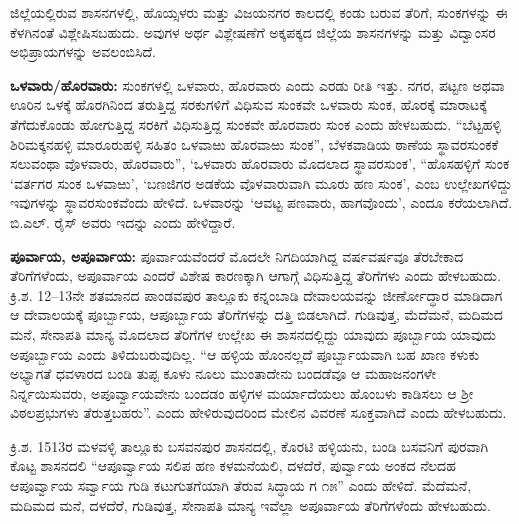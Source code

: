 ಜಿಲ್ಲೆಯಲ್ಲಿರುವ ಶಾಸನಗಳಲ್ಲಿ, ಹೊಯ್ಸಳರು ಮತ್ತು ವಿಜಯನಗರ ಕಾಲದಲ್ಲಿ ಕಂಡು ಬರುವ ತೆರಿಗೆ, ಸುಂಕಗಳನ್ನು ಈ ಕೆಳಗಿನಂತೆ ವಿಶ್ಲೇಷಿಸಬಹುದು. ಅವುಗಳ ಅರ್ಥ ವಿಶ್ಲೇಷಣೆಗೆ ಅಕ್ಕಪಕ್ಕದ ಜಿಲ್ಲೆಯ ಶಾಸನಗಳನ್ನು ಮತ್ತು ವಿದ್ವಾಂಸರ ಅಭಿಪ್ರಾಯಗಳನ್ನು ಅವಲಂಬಿಸಿದೆ.

\newpage

\textbf{ಒಳವಾರು/ಹೊರವಾರು: } ಸುಂಕಗಳಲ್ಲಿ ಒಳವಾರು, ಹೊರವಾರು ಎಂದು ಎರಡು ರೀತಿ ಇತ್ತು. ನಗರ, ಪಟ್ಟಣ ಅಥವಾ ಊರಿನ ಒಳಕ್ಕೆ ಹೊರಗಿನಿಂದ ತರುತ್ತಿದ್ದ ಸರಕುಗಳಿಗೆ ವಿಧಿಸುವ ಸುಂಕವೇ ಒಳವಾರು ಸುಂಕ, ಹೊರಕ್ಕೆ ಮಾರಾಟಕ್ಕೆ ತೆಗೆದುಕೊಂಡು ಹೋಗುತ್ತಿದ್ದ ಸರಕಿಗೆ ವಿಧಿಸುತ್ತಿದ್ದ ಸುಂಕವೇ ಹೊರವಾರು ಸುಂಕ ಎಂದು ಹೇಳಬಹುದು. “ಬೆಟ್ಟಹಳ್ಳಿ ಶಿರಿಮಕ್ಕನಹಳ್ಳಿ ಮಾರೂರುಹಳ್ಳಿ ಸಹಿತಂ ಒಳವಾಱು ಹೊರವಾಱು ಸುಂಕ”, ಬೆಳಕವಾಡಿಯ ಠಾಣೆಯ ಸ್ಥಾವರಸುಂಕಕೆ ಸಲುವಂಥಾ ವೊಳವಾರು, ಹೊರವಾರು”, ‘ಒಳವಾರು ಹೊರವಾರು ಮೊದಲಾದ ಸ್ಥಾವರಸುಂಕ’, “ಹೊಸಹಳ್ಳಿಗೆ ಸುಂಕ ‘ವರ್ತಗರ ಸುಂಕ ಒಳವಾಱು’, ‘ಬಣಜಿಗರ ಅಡಕೆಯ ವೊಳವಾರುವಾಗಿ ಮೂರು ಹಣ ಸುಂಕ’, ಎಂಬ ಉಲ್ಲೇಖಗಳಿದ್ದು ಇವುಗಳನ್ನು ಸ್ಥಾವರಸುಂಕವೆಂದು ಹೇಳಿದೆ. ಒಳವಾರನ್ನು ‘ಆವಟ್ಟ ಪಣವಾರು, ಹಾಗವೊಂದು’, ಎಂದೂ ಕರೆಯಲಾಗಿದೆ. ಬಿ.ಎಲ್​. ರೈಸ್​ ಅವರು ಇದನ್ನು  ಎಂದು ಹೇಳಿದ್ದಾರೆ.

\textbf{ಪೂರ್ವಾಯ, ಅಪೂರ್ವಾಯ: } ಪೂರ್ವಾಯವೆಂದರೆ ಮೊದಲೇ ನಿಗದಿಯಾಗಿದ್ದ ವರ್ಷವರ್ಷವೂ ತೆರಬೇಕಾದ ತೆರಿಗೆಗಳೆಂದು, ಅಪೂರ್ವಾಯ ಎಂದರೆ ವಿಶೇಷ ಕಾರಣಕ್ಕಾಗಿ ಆಗಾಗ್ಗೆ ವಿಧಿಸುತ್ತಿದ್ದ ತೆರಿಗೆಗಳು ಎಂದು ಹೇಳಬಹುದು. ಕ್ರಿ.ಶ. 12–13ನೇ ಶತಮಾನದ ಪಾಂಡವಪುರ ತಾಲ್ಲೂಕು ಕನ್ನಂಬಾಡಿ ದೇವಾಲಯವನ್ನು ಜೀರ್ಣೋದ್ಧಾರ ಮಾಡಿದಾಗ ಆ ದೇವಾಲಯಕ್ಕೆ ಪೂರ್ಬ್ಬಾಯ, ಆಪೂರ್ಬ್ಬಾಯ ತೆರಿಗೆಗಳನ್ನು ದತ್ತಿ ಬಿಡಲಾಗಿದೆ. ಗುಡಿವುತ್ತ, ಮೆದೆಮನೆ, ಮದಿಮದ ಮನೆ, ಸೇನಾಪತಿ ಮಾನ್ಯ ಮೊದಲಾದ ತೆರಿಗೆಗಳ ಉಲ್ಲೇಖ ಈ ಶಾಸನದಲ್ಲಿದ್ದು ಯಾವುದು ಪೂರ್ಬ್ಬಾಯ ಯಾವುದು ಅಪೂರ್ಬ್ಬಾಯ ಎಂದು ತಿಳಿದುಬರುವುದಿಲ್ಲ. “ಆ ಹಳ್ಳಿಯ ಹೊಂನಲ್ಲದೆ ಪೂರ್ಬ್ಬಾಯವಾಗಿ ಬಹ ಖಾಣ ಕಳುಕು ಅಭ್ಯಾಗತೆ ಧವಳಾರದ ಬಂಡಿ ತುಪ್ಪ ಕೂಳು ನೂಲು ಮುಂತಾದೇನು ಬಂದಡೆವೂ ಆ ಮಹಾಜನಂಗಳೇ ನಿರ್ನ್ನಯಿಸುವರು, ಅಪೂರ್ವ್ವಾಯವೇನು ಬಂದಡಂ ಹಳ್ಳಿಗಳ ಮರ್ಯಾದೆಯಲು ಹೊಂಬಳು ಕಾಡಿಸಲು ಆ ಶ‍್ರೀ ವಿಠಲಪ್ರಭುಗಳು ತೆರುತ್ತಬಹರು”. ಎಂದು ಹೇಳಿರುವುದರಿಂದ ಮೇಲಿನ ವಿವರಣೆ ಸೂಕ್ತವಾಗಿದೆ ಎಂದು ಹೇಳಬಹುದು.

ಕ್ರಿ.ಶ. 1513ರ ಮಳವಳ್ಳಿ ತಾಲ್ಲೂಕು ಬಸವನಪುರ ಶಾಸನದಲ್ಲಿ, ಕೊರಟಿ ಹಳ್ಳಿಯನು, ಬಂಡಿ ಬಸವನಿಗೆ ಪುರವಾಗಿ ಕೊಟ್ಟ ಶಾಸನದಲಿ “ಆಪೂರ್ವ್ವಾಯ ಸಲಿಪ ಹಣ ಕಳಮನೆಯಲಿ, ದಳದೆರೆ, ಪುರ್ವ್ವಾಯ ಅಂಕದ ನೆಲದಹ ಆಪೂರ್ವ್ವಾಯ ಸರ್ವ್ವಾಯ ಗುಡಿ ಕಟುಗುತಗೆಯಾಗಿ ತೆರುವ ಸಿದ್ಧಾಯ ಗ ೧೫” ಎಂದು ಹೇಳಿದೆ. ಮೆದೆಮನೆ, ಮದಿಮದ ಮನೆ, ದಳದೆರೆ, ಗುಡಿವುತ್ತ, ಸೇನಾಪತಿ ಮಾನ್ಯ ಇವೆಲ್ಲಾ ಅಪೂರ್ವಾಯ ತೆರಿಗೆಗಳೆಂದು ಹೇಳಬಹುದು.

